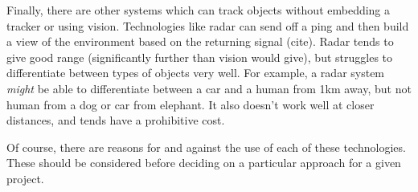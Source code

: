 Finally, there are other systems which can track objects without embedding a tracker or using vision. Technologies like radar can send off a ping and then build a view of the environment based on the returning signal {\color{red} (cite)}. Radar tends to give good range (significantly further than vision would give), but struggles to differentiate between types of objects very well. For example, a radar system \emph{might} be able to differentiate between a car and a human from 1km away, but not human from a dog or car from elephant. It also doesn't work well at closer distances, and tends have a prohibitive cost.

Of course, there are reasons for and against the use of each of these technologies. These should be considered before deciding on a particular approach for a given project.

